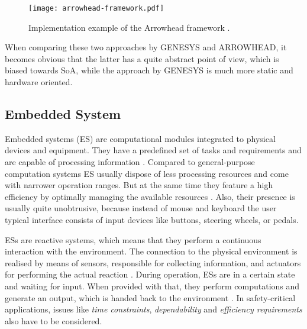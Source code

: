 \begin{figure}[!htbp]
\centering
\texttt{[image: arrowhead-framework.pdf]}
\caption{Implementation example of the Arrowhead framework \cite{arrowhead:presentation}.}
\label{fig:arrowhead-framework}
\end{figure}

When comparing these two approaches by GENESYS and ARROWHEAD, it becomes obvious that the latter has a quite abstract point of view, which is biased towards SoA, while the approach by GENESYS is much more static and hardware oriented.



\subsection{Embedded System}
\label{sec:embedded_system}

Embedded systems (ES) are computational modules integrated to physical devices and equipment. They have a predefined set of tasks and requirements and are capable of processing information \cite{rodrigues2011} \cite[p.xiii]{marwedel}. Compared to general-purpose computation systems ES usually dispose of less processing resources and come with narrower operation ranges. But at the same time they feature a high efficiency by optimally managing the available resources \cite[p.283]{alippi} \cite[p.5]{marwedel}. Also, their presence is usually quite unobtrusive, because instead of mouse and keyboard the user typical interface consists of input devices like buttons, steering wheels, or pedals.

ESs are reactive systems, which means that they perform a continuous interaction with the environment. The connection to the physical environment is realised by means of sensors, responsible for collecting information, and actuators for performing the actual reaction \cite[p.8-9]{marwedel}. During operation, ESs are in a certain state and waiting for input. When provided with that, they perform computations and generate an output, which is handed back to the environment \cite[p.9]{marwedel}. In safety-critical applications, issues like \emph{time constraints}, \emph{dependability} and \emph{efficiency requirements} also have to be considered.

